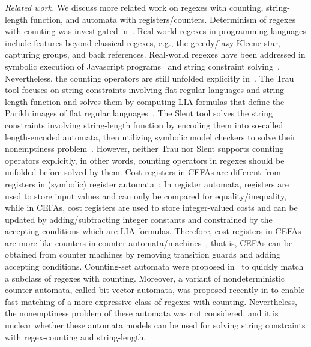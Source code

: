 \medskip
\noindent
\emph{Related work.} 
We discuss more related work on regexes with counting, string-length function, and automata with registers/counters.  
%
Determinism of regexes with counting was investigated in~\cite{GGM12,CL15}. 
%
Real-world regexes in programming languages include features beyond classical regexes, e.g., the greedy/lazy Kleene star, capturing groups, and back references. Real-world regexes have been addressed in symbolic execution of Javascript programs~\cite{LMK19} and string constraint solving~\cite{CF+22}. 
Nevertheless, the counting operators are still unfolded explicitly in~\cite{CF+22}. 
%
The Trau tool focuses on string constraints involving flat regular languages and string-length function and solves them by computing LIA formulas that define the Parikh images of flat regular languages~\cite{z3trau}. The Slent tool solves the string constraints involving string-length function by encoding them into so-called length-encoded automata, then utilizing symbolic model checkers to solve their nonemptiness problem~\cite{WC+18}. However, neither Trau nor Slent supports counting operators explicitly, in other words, counting operators in regexes should be unfolded before solved by them.
%
Cost registers in CEFAs are different from registers in (symbolic) register automata~\cite{ra,sra}:  In register automata, registers are used to store input values and  can only be compared for equality/inequality, while in CEFAs, cost registers are used to store integer-valued costs and can be updated by adding/subtracting integer constants and constrained by the accepting conditions which are LIA formulas.
%
Therefore, cost registers in CEFAs are more like counters in counter automata/machines~\cite{Minsky67}, that is, CEFAs can be obtained from counter machines by removing  transition guards and adding accepting conditions. 
%
%
Counting-set automata were proposed in~\cite{redos_lenka,HS+23} to quickly match a subclass of regexes with counting. Moreover, a variant of nondeterministic counter automata, called bit vector automata, was proposed recently in \cite{GKM23} to enable fast matching of a more expressive class of regexes with counting.   Nevertheless, the nonemptiness problem of these automata was not considered, and it is unclear whether these automata models can be used for solving string constraints with regex-counting and string-length. 

